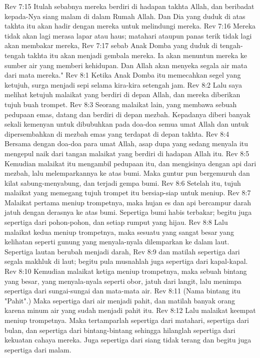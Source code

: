 Rev 7:15  Itulah sebabnya mereka berdiri di hadapan takhta Allah, dan beribadat kepada-Nya siang malam di dalam Rumah Allah. Dan Dia yang duduk di atas takhta itu akan hadir dengan mereka untuk melindungi mereka.
Rev 7:16  Mereka tidak akan lagi merasa lapar atau haus; matahari ataupun panas terik tidak lagi akan membakar mereka,
Rev 7:17  sebab Anak Domba yang duduk di tengah-tengah takhta itu akan menjadi gembala mereka. Ia akan menuntun mereka ke sumber air yang memberi kehidupan. Dan Allah akan menyeka segala air mata dari mata mereka."
Rev 8:1  Ketika Anak Domba itu memecahkan segel yang ketujuh, surga menjadi sepi selama kira-kira setengah jam.
Rev 8:2  Lalu saya melihat ketujuh malaikat yang berdiri di depan Allah, dan mereka diberikan tujuh buah trompet.
Rev 8:3  Seorang malaikat lain, yang membawa sebuah pedupaan emas, datang dan berdiri di depan mezbah. Kepadanya diberi banyak sekali kemenyan untuk dibubuhkan pada doa-doa semua umat Allah dan untuk dipersembahkan di mezbah emas yang terdapat di depan takhta.
Rev 8:4  Bersama dengan doa-doa para umat Allah, asap dupa yang sedang menyala itu mengepul naik dari tangan malaikat yang berdiri di hadapan Allah itu.
Rev 8:5  Kemudian malaikat itu mengambil pedupaan itu, dan mengisinya dengan api dari mezbah, lalu melemparkannya ke atas bumi. Maka guntur pun bergemuruh dan kilat sabung-menyabung, dan terjadi gempa bumi.
Rev 8:6  Setelah itu, tujuh malaikat yang memegang tujuh trompet itu bersiap-siap untuk meniup.
Rev 8:7  Malaikat pertama meniup trompetnya, maka hujan es dan api bercampur darah jatuh dengan derasnya ke atas bumi. Sepertiga bumi habis terbakar; begitu juga sepertiga dari pohon-pohon, dan setiap rumput yang hijau.
Rev 8:8  Lalu malaikat kedua meniup trompetnya, maka sesuatu yang sangat besar yang kelihatan seperti gunung yang menyala-nyala dilemparkan ke dalam laut. Sepertiga lautan berubah menjadi darah,
Rev 8:9  dan matilah sepertiga dari segala makhluk di laut; begitu pula musnahlah juga sepertiga dari kapal-kapal.
Rev 8:10  Kemudian malaikat ketiga meniup trompetnya, maka sebuah bintang yang besar, yang menyala-nyala seperti obor, jatuh dari langit, lalu menimpa sepertiga dari sungai-sungai dan mata-mata air.
Rev 8:11  (Nama bintang itu "Pahit".) Maka sepertiga dari air menjadi pahit, dan matilah banyak orang karena minum air yang sudah menjadi pahit itu.
Rev 8:12  Lalu malaikat keempat meniup trompetnya. Maka tertamparlah sepertiga dari matahari, sepertiga dari bulan, dan sepertiga dari bintang-bintang sehingga hilanglah sepertiga dari kekuatan cahaya mereka. Juga sepertiga dari siang tidak terang dan begitu juga sepertiga dari malam.

